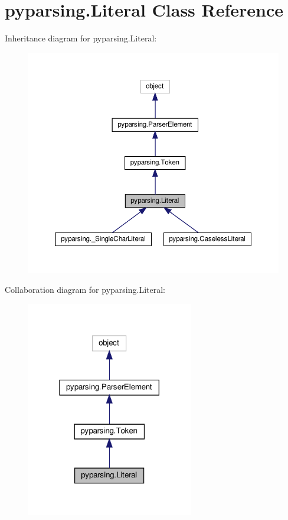 \hypertarget{classpyparsing_1_1Literal}{}\section{pyparsing.\+Literal Class Reference}
\label{classpyparsing_1_1Literal}


Inheritance diagram for pyparsing.\+Literal\+:
\nopagebreak
\begin{figure}[H]
\begin{center}
\leavevmode
\includegraphics[width=350pt]{classpyparsing_1_1Literal__inherit__graph}
\end{center}
\end{figure}


Collaboration diagram for pyparsing.\+Literal\+:
\nopagebreak
\begin{figure}[H]
\begin{center}
\leavevmode
\includegraphics[width=206pt]{classpyparsing_1_1Literal__coll__graph}
\end{center}
\end{figure}
